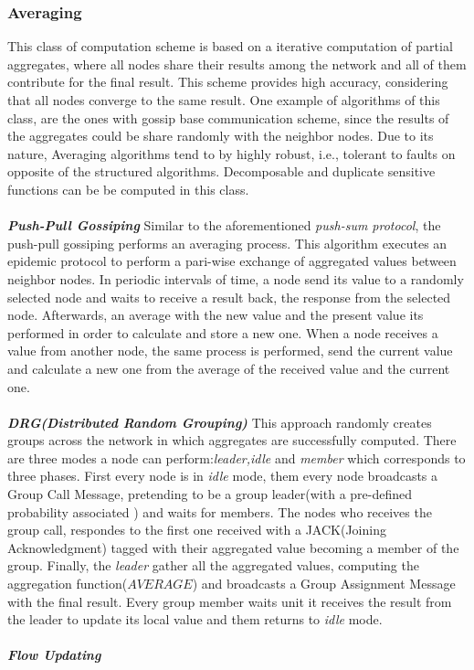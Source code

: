 \subsubsection{Averaging}
This class of computation scheme is based on a iterative computation of partial aggregates, where all nodes share their results among the network and all of them contribute for the final result. This scheme provides high accuracy, considering that all nodes converge to the same result. One example of algorithms of this class, are the ones with gossip base communication scheme, since the results of the aggregates could be share randomly with the neighbor nodes. Due to its nature, Averaging algorithms tend to by highly robust, i.e., tolerant to faults on opposite of the structured algorithms. Decomposable and duplicate sensitive functions can be be computed in this class.\\
\\
\textbf{\textit{Push-Pull Gossiping}} Similar to the aforementioned \textit{push-sum protocol}, the push-pull gossiping\cite{jelasity2004epidemic} performs an averaging process. This algorithm executes an epidemic protocol to perform a pari-wise exchange of aggregated values between neighbor nodes\cite{journals/corr/abs-1110-0725}. In periodic intervals of time, a node send its value to a randomly selected node and waits to receive a result back, the response from the selected node. Afterwards, an average with the new value and the present value its performed in order to calculate and store a new one. When a node receives a value from another node, the same process is performed, send the current value and calculate a new one from the average of the received value and the current one.\\ 
\\
\textbf{\textit{DRG(Distributed Random Grouping)}} This approach \cite{chen2006robust} randomly creates groups across the network in which aggregates are successfully computed. There are three modes a node can perform:\textit{leader,idle} and \textit{member} which corresponds to three phases. First every node is in \textit{idle} mode, them every node broadcasts a Group Call Message, pretending to be a group leader(with a pre-defined probability associated ) and waits for members. The nodes who receives the group call, respondes to the first one received with a JACK(Joining Acknowledgment) tagged with their aggregated value becoming a member of the group. Finally, the \textit{leader} gather all the aggregated values, computing the aggregation function($AVERAGE$) and broadcasts a Group Assignment Message with the  final result. Every group member waits unit it receives the result from the leader to update its local value and them returns to  \textit{idle} mode.\\
\\
\textbf{\textit{Flow Updating}}\\

